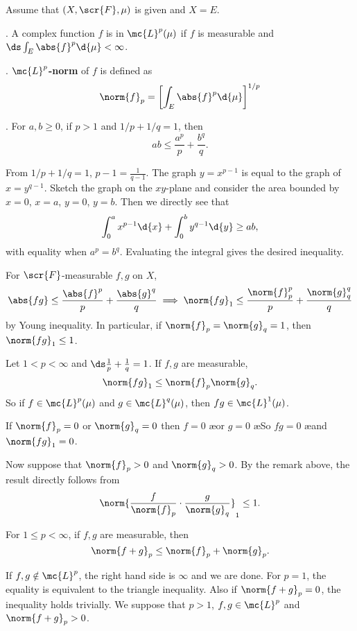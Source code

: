 Assume that \((X, \scr{F}, \mu)\) is given and \(X = E\).

.  A complex function \(f\) is in \(\mc{L}^{p}(\mu)\) if \(f\) is measurable and \(\ds \int_E \abs{f}^p \d{\mu} < \infty\).

.  \textbf{\(\mc{L}^{p}\)-norm} of \(f\) is defined as
\[
    \norm{f}_p = \left[\int_E \abs{f}^p \d{\mu} \right]^{1/p}
\]

\thm.  For \(a, b \geq 0\), if \(p > 1\) and \(1/p + 1/q = 1\), then
\[
    ab \leq \frac{a^p}{p} + \frac{b^q}{q}.
\]

\pf From \(1/p + 1/q = 1\), \(p - 1 = \frac{1}{q - 1}\). The graph \(y = x^{p - 1}\) is equal to the graph of \(x = y^{q - 1}\). Sketch the graph on the \(xy\)-plane and consider the area bounded by \(x = 0\), \(x = a\), \(y = 0\), \(y = b\). Then we directly see that
\[
    \int_0^a x^{p-1} \d{x} + \int_0^b y^{q-1} \d{y} \geq ab,
\]
with equality when \(a^p = b^q\). Evaluating the integral gives the desired inequality.

\rmk For \(\scr{F}\)-measurable \(f, g\) on \(X\),
\[
    \abs{fg} \leq \frac{\abs{f}^p}{p} + \frac{\abs{g}^q}{q} \implies \norm{fg}_1 \leq \frac{\norm{f}_p^p}{p} + \frac{\norm{g}_q^q}{q}
\]
by Young inequality. In particular, if \(\norm{f}_p = \norm{g}_q = 1\), then \(\norm{fg}_1 \leq 1\).

  Let \(1 < p < \infty\) and \(\ds \frac{1}{p} + \frac{1}{q} = 1\). If \(f, g\) are measurable,
\[
    \norm{fg}_1 \leq \norm{f}_p \norm{g}_q.
\]
So if \(f \in \mc{L}^{p}(\mu)\) and \(g \in \mc{L}^{q}(\mu)\), then \(fg \in \mc{L}^{1}(\mu)\).

\pf If \(\norm{f}_p = 0\) or \(\norm{g}_q = 0\) then \(f = 0\) \ae or \(g = 0\) \ae So \(fg = 0\) \ae and \(\norm{fg}_1 = 0\).

Now suppose that \(\norm{f}_p > 0\) and \(\norm{g}_q > 0\). By the remark above, the result directly follows from
\[
    \norm{\frac{f}{\norm{f}_p} \cdot \frac{g}{\norm{g}_q}}_1 \leq 1.
\]

  For \(1 \leq p < \infty\), if \(f, g\) are measurable, then
\[
    \norm{f + g}_p \leq \norm{f}_p + \norm{g}_p.
\]

\pf If \(f, g \notin \mc{L}^{p}\), the right hand side is \(\infty\) and we are done. For \(p = 1\), the equality is equivalent to the triangle inequality. Also if \(\norm{f + g}_p = 0\), the inequality holds trivially. We suppose that \(p > 1\), \(f, g \in \mc{L}^p\) and \(\norm{f+g}_p > 0\).

